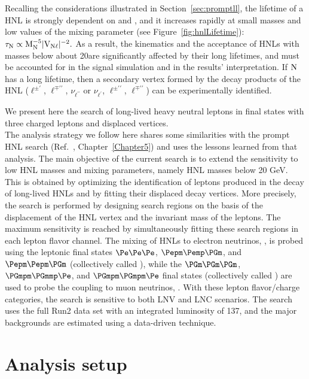 Recalling the considerations illustrated in Section~\ref{sec:promptll}, the lifetime of a HNL is strongly dependent on \mhnl and \mixpar,
and it increases rapidly at small masses and low values of the mixing
parameter (see Figure~\ref{fig:hnlLifetime}):
\(\tau_\mathrm{N}\propto\mathrm{M_{\mathrm{N}}^{-5}|V_{\mathrm{N}\ell}|^{-2}}.\)
As a result, the kinematics and the acceptance of HNLs with masses
below about 20\GeV are significantly affected by their long lifetimes,
and must be accounted for in the signal simulation and in the results'
interpretation.
If $\mathrm{N}$ has a long lifetime, then a secondary vertex formed by the decay products of the HNL ($\ell^{\pm\prime}$, $\ell^{\mp\prime\prime}$, $\nu_{\ell^{\prime\prime}}$ or
$\nu_{\ell^{\prime}}$, $\ell^{\pm\prime\prime}$,
$\ell^{\mp\prime\prime}$) can be experimentally identified. 

We present here the search of long-lived heavy neutral leptons in final states
with three charged leptons and displaced vertices.\\
The analysis strategy we follow here shares some similarities with the
prompt HNL search (Ref.~\cite{Sirunyan:2018mtv}, Chapter~\ref{Chapter5})
and uses the lessons learned from that
analysis. 
The main objective of the current search is to extend the
sensitivity to low HNL masses and mixing parameters, namely HNL masses
below 20 GeV. This is obtained by optimizing the identification
of leptons produced in the decay of long-lived HNLs and by fitting
their displaced decay vertices. More precisely, the search is
performed by designing search regions on the basis of
the displacement of
the HNL vertex and the invariant mass of the \displ leptons. The
maximum sensitivity is reached by simultaneously fitting these search
regions in each lepton flavor channel. The mixing of HNLs to electron
neutrinos, \mixpare, is probed using the leptonic final states 
$\Pe\Pe\Pe$, $\Pepm\Pemp\PGm$, and $\Pepm\Pepm\PGm$ (collectively
called \eex),
while the $\PGm\PGm\PGm$,  $\PGmpm\PGmmp\Pe$, and $\PGmpm\PGmpm\Pe$
final states (collectively called \mmx) are used to probe the coupling to
muon neutrinos, \mixparm.
With these lepton flavor/charge categories, the search is
sensitive to both LNV and LNC scenarios.
The search uses the full Run2 data set with an integrated luminosity
of 137\fbinv, and the major backgrounds are estimated using a
data-driven technique.

\section{Analysis setup}
